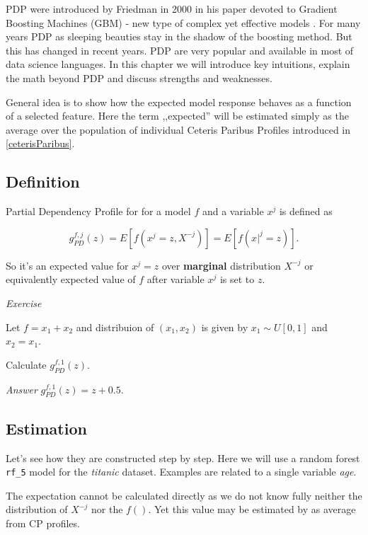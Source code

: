 \documentclass[12pt,]{krantz}
\begin{document}
PDP were introduced by Friedman in 2000 in his paper devoted to Gradient Boosting Machines (GBM) - new type of complex yet effective models \citep{Friedman00greedyfunction}. For many years PDP as sleeping beauties stay in the shadow of the boosting method. But this has changed in recent years. PDP are very popular and available in most of data science languages. In this chapter we will introduce key intuitions, explain the math beyond PDP and discuss strengths and weaknesses.

General idea is to show how the expected model response behaves as a function of a selected feature. Here the term ,,expected'' will be estimated simply as the average over the population of individual Ceteris Paribus Profiles introduced in \ref{ceterisParibus}.

\hypertarget{definition}{%
\subsection{Definition}\label{definition}}

Partial Dependency Profile for for a model \(f\) and a variable \(x^j\) is defined as

\[
g_{PD}^{f, j}(z) = E[f(x^j=z, X^{-j})] = E[f(x|^j=z)].
\]

So it's an expected value for \(x^j = z\) over \textbf{marginal} distribution \(X^{-j}\) or equivalently expected value of \(f\) after variable \(x^j\) is set to \(z\).

\emph{Exercise}

Let \(f = x_1 + x_2\) and distribuion of \((x_1, x_2)\) is given by \(x_1 \sim U[0,1]\) and \(x_2=x_1\).

Calculate \(g_{PD}^{f, 1}(z)\).

\emph{Answer} \(g_{PD}^{f, 1}(z) = z + 0.5\).

\hypertarget{estimation}{%
\subsection{Estimation}\label{estimation}}

Let's see how they are constructed step by step.
Here we will use a random forest \texttt{rf\_5} model for the \emph{titanic} dataset. Examples are related to a single variable \emph{age}.

The expectation cannot be calculated directly as we do not know fully neither the distribution of \(X^{-j}\) nor the \(f()\). Yet this value may be estimated by as average from CP profiles.
\end{document}
